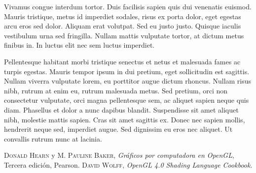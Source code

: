 \documentclass[a4paper, twoside]{article}
\begin{document}
Vivamus congue interdum tortor. Duis facilisis sapien quis dui venenatis euismod. Mauris tristique, metus id imperdiet sodales, risus ex porta dolor, eget egestas arcu eros sed dolor. Aliquam erat volutpat. Sed eu justo justo. Quisque iaculis vestibulum urna sed fringilla. Nullam mattis vulputate tortor, at dictum metus finibus in. In luctus elit nec sem luctus imperdiet.

Pellentesque habitant morbi tristique senectus et netus et malesuada fames ac turpis egestas. Mauris tempor ipsum in dui pretium, eget sollicitudin est sagittis. Nullam viverra vulputate lorem, eu porttitor augue dictum rhoncus. Nullam risus nibh, rutrum at enim eu, rutrum malesuada metus. Sed pretium, orci non consectetur vulputate, orci magna pellentesque sem, ac aliquet sapien neque quis diam. Phasellus et dolor a nunc dapibus blandit. Suspendisse sit amet aliquet nibh, molestie mattis sapien. Cras sit amet sagittis ex. Donec nec sapien mollis, hendrerit neque sed, imperdiet augue. Sed dignissim eu eros nec aliquet. Ut convallis rutrum nunc at lacinia. 


\newpage
\newcommand{\bibliographyname}{Bibliografía} %
\addcontentsline{toc}{section}{\bibliographyname} %
\renewcommand\refname{\bibliographyname} %
\begin{thebibliography}{X}
	 \textsc{Donald Hearn} y \textsc{M. Pauline Baker}, \textit{Gráficos por computadora en OpenGL}, Tercera edición, Pearson.
	 \textsc{David Wolff}, \textit{OpenGL 4.0 Shading Language Cookbook}.
\end{thebibliography}

\makeseccioncolaboradores %

\makehistorial
\end{document}
